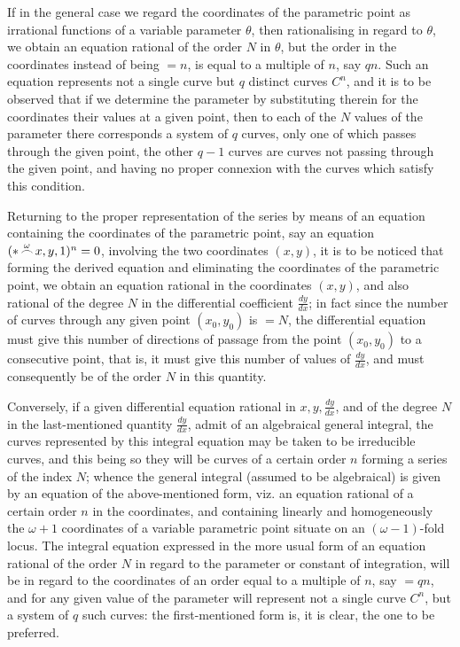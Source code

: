 \documentclass[12pt,a4paper]{article}
\begin{document}
If in the general case we regard the coordinates of the parametric point as irrational functions of a variable parameter $\theta$, then rationalising in regard to $\theta$, we obtain an equation rational of the order $N$ in $\theta$, but the order in the coordinates instead of being $= n$, is equal to a multiple of $n$, say $qn$. Such an equation represents not a single curve but $q$ distinct curves $C^n$, and it is to be observed that if we determine the parameter by substituting therein for the coordinates their values at a given point, then to each of the $N$ values of the parameter there corresponds a system of $q$ curves, only one of which passes through the given point, the other $q - 1$ curves are curves not passing through the given point, and having no proper connexion with the curves which satisfy this condition.

Returning to the proper representation of the series by means of an equation containing the coordinates of the parametric point, say an equation $(\ast\mskip-2mu\overset{\omega}{\frown}\mskip-2mu x, y, 1)^n = 0$, involving the two coordinates $(x, y)$, it is to be noticed that forming the derived equation and eliminating the coordinates of the parametric point, we obtain an equation rational in the coordinates $(x, y)$, and also rational of the degree $N$ in the differential coefficient $\tfrac{dy}{dx}$; in fact since the number of curves through any given point $(x_0, y_0)$ is $= N$, the differential equation must give this number of directions of passage from the point $(x_0, y_0)$ to a consecutive point, that is, it must give this number of values of $\tfrac{dy}{dx}$, and must consequently be of the order $N$ in this quantity.

Conversely, if a given differential equation rational in $x, y, \tfrac{dy}{dx}$, and of the degree $N$ in the last-mentioned quantity $\tfrac{dy}{dx}$, admit of an algebraical general integral, the curves represented by this integral equation may be taken to be irreducible curves, and this being so they will be curves of a certain order $n$ forming a series of the index $N$; whence the general integral (assumed to be algebraical) is given by an equation of the above-mentioned form, viz. an equation rational of a certain order $n$ in the coordinates, and containing linearly and homogeneously the $\omega + 1$ coordinates of a variable parametric point situate on an $(\omega - 1)$-fold locus. The integral equation expressed in the more usual form of an equation rational of the order $N$ in regard to the parameter or constant of integration, will be in regard to the coordinates of an order equal to a multiple of $n$, say $= qn$, and for any given value of the parameter will represent not a single curve $C^n$, but a system of $q$ such curves: the first-mentioned form is, it is clear, the one to be preferred.
\end{document}
